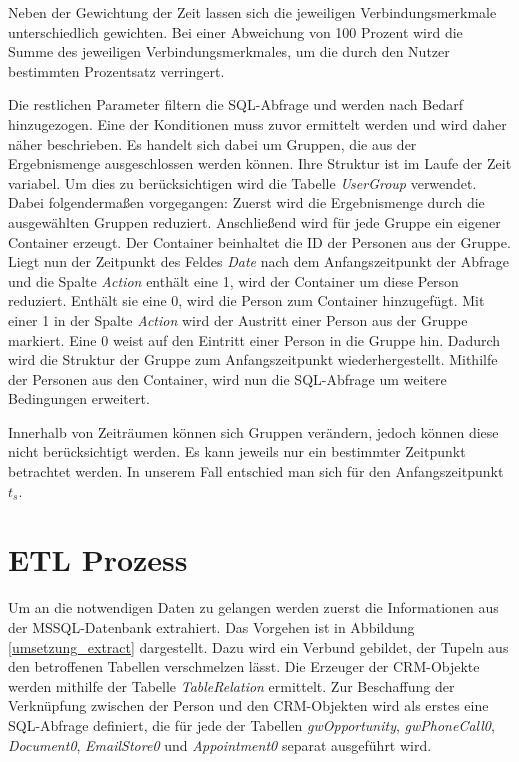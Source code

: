 Neben der Gewichtung der Zeit lassen sich die jeweiligen Verbindungsmerkmale unterschiedlich gewichten. Bei einer Abweichung von 100 Prozent wird die Summe des jeweiligen Verbindungsmerkmales, um die durch den Nutzer bestimmten Prozentsatz verringert. 

Die restlichen Parameter filtern die SQL-Abfrage und werden nach Bedarf hinzugezogen. Eine der Konditionen muss zuvor ermittelt werden und wird daher näher beschrieben. Es handelt sich dabei um Gruppen, die aus der Ergebnismenge ausgeschlossen werden können. Ihre Struktur ist im Laufe der Zeit variabel. Um dies zu berücksichtigen wird die Tabelle \textit{UserGroup} verwendet. Dabei folgendermaßen vorgegangen: Zuerst wird die Ergebnismenge durch die ausgewählten Gruppen reduziert. Anschließend wird für jede Gruppe ein eigener Container erzeugt. Der Container beinhaltet die ID der Personen aus der Gruppe. Liegt nun der Zeitpunkt des Feldes \textit{Date} nach dem Anfangszeitpunkt der Abfrage und die Spalte \textit{Action} enthält eine 1, wird der Container um diese Person reduziert. Enthält sie eine 0, wird die Person zum Container hinzugefügt. Mit einer 1 in der Spalte \textit{Action} wird der Austritt einer Person aus der Gruppe markiert. Eine 0 weist auf den Eintritt einer Person in die Gruppe hin. Dadurch wird die Struktur der Gruppe zum Anfangszeitpunkt wiederhergestellt. Mithilfe der Personen aus den Container, wird nun die SQL-Abfrage um weitere Bedingungen erweitert.

Innerhalb von Zeiträumen können sich Gruppen verändern, jedoch können diese nicht berücksichtigt werden. Es kann jeweils nur ein bestimmter Zeitpunkt betrachtet werden. In unserem Fall entschied man sich für den Anfangszeitpunkt $t_{s}$.

\section{ETL Prozess}

Um an die notwendigen Daten zu gelangen werden zuerst die Informationen aus der MSSQL-Datenbank extrahiert. Das Vorgehen ist in Abbildung \ref{umsetzung_extract} dargestellt. Dazu wird ein Verbund gebildet, der Tupeln aus den betroffenen Tabellen verschmelzen lässt. Die Erzeuger der CRM-Objekte werden mithilfe der Tabelle \textit{TableRelation} ermittelt. Zur Beschaffung der Verknüpfung zwischen der Person und den CRM-Objekten wird als erstes eine SQL-Abfrage definiert, die für jede der Tabellen \textit{gwOpportunity}, \textit{gwPhoneCall0}, \textit{Document0}, \textit{EmailStore0} und \textit{Appointment0} separat ausgeführt wird. 

